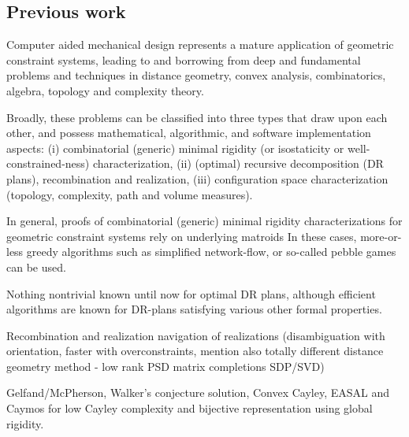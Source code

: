 \subsection{Previous work}

Computer aided mechanical design represents a mature application of geometric constraint systems,  leading to and borrowing 
from deep and fundamental problems and techniques in distance geometry, convex analysis, combinatorics, algebra, topology 
and complexity theory.

Broadly, these problems can be classified into three types that draw upon each other, and possess mathematical, algorithmic, 
and software implementation aspects: (i) combinatorial (generic) minimal rigidity (or isostaticity or well-constrained-ness) 
characterization, (ii) (optimal) recursive decomposition (DR plans), recombination and realization, (iii) configuration space 
characterization (topology, complexity, path and volume measures).

In general, proofs of combinatorial (generic) minimal rigidity characterizations for geometric constraint systems rely on 
underlying matroids  In these cases, more-or-less greedy algorithms such as simplified network-flow, 
or so-called pebble games can be used.

Nothing nontrivial known until now for optimal DR plans, although efficient algorithms are known for DR-plans satisfying 
various other formal properties.

Recombination and realization navigation of realizations (disambiguation with orientation, faster with overconstraints, mention 
also totally different distance geometry method - low rank PSD matrix completions SDP/SVD)

Gelfand/McPherson, Walker's conjecture solution, Convex Cayley, EASAL and Caymos for low Cayley complexity and bijective 
representation using global rigidity.

